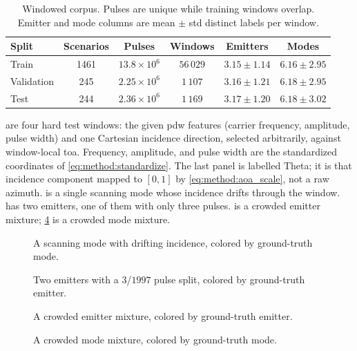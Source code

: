 \begin{table}[t]
  \centering
  \caption{Windowed corpus. Pulses are unique while training windows overlap. Emitter and mode columns are mean $\pm$ std distinct labels per window.}
  \label{tab:exp:datasets}
  \begin{tabular}{@{}lccccc@{}}
    \toprule
    Split & Scenarios & Pulses & Windows & Emitters & Modes \\
    \midrule
    Train & 1461 & $13.8 \times 10^{6}$ & $56\,029$ & $3.15 \pm 1.14$ & $6.16 \pm 2.95$ \\
    Validation & 245 & $2.25 \times 10^{6}$ & $1\,107$ & $3.16 \pm 1.21$ & $6.18 \pm 2.95$ \\
    Test & 244 & $2.36 \times 10^{6}$ & $1\,169$ & $3.17 \pm 1.20$ & $6.18 \pm 3.02$ \\
    \bottomrule
  \end{tabular}
\end{table}

 are four hard test windows: the given \gls{pdw} features (carrier frequency, amplitude, pulse width) and one Cartesian incidence direction, selected arbitrarily, against window-local \gls{toa}.
Frequency, amplitude, and pulse width are the standardized coordinates of \cref{eq:method:standardize}.
The last panel is labelled Theta; it is that incidence component mapped to $[0,1]$ by \cref{eq:method:aoa_scale}, not a raw azimuth.
 is a single scanning mode whose incidence drifts through the window.
 has two emitters, one of them with only three pulses.
 is a crowded emitter mixture; \cref{fig:exp:feat_maxmode} is a crowded mode mixture.

\begin{figure}[H]
  \centering
  \caption{A scanning mode with drifting incidence, colored by ground-truth mode.}
  \label{fig:exp:feat_scan}
\end{figure}

\begin{figure}[H]
  \centering
  \caption{Two emitters with a $3$/$1997$ pulse split, colored by ground-truth emitter.}
  \label{fig:exp:feat_imbalance}
\end{figure}

\begin{figure}[H]
  \centering
  \caption{A crowded emitter mixture, colored by ground-truth emitter.}
  \label{fig:exp:feat_maxemitters}
\end{figure}

\begin{figure}[H]
  \centering
  \caption{A crowded mode mixture, colored by ground-truth mode.}
  \label{fig:exp:feat_maxmode}
\end{figure}
